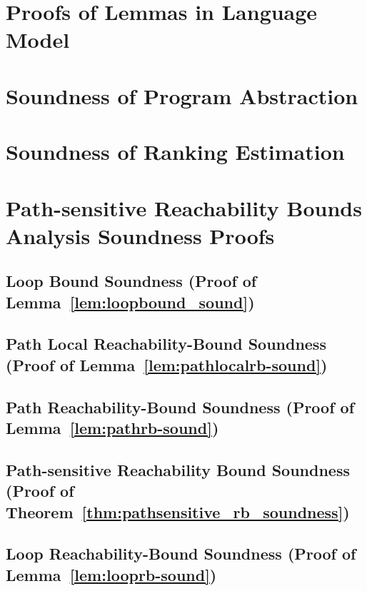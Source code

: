 % 


\section{Proofs of Lemmas in Language Model}
\label{apdx:lem_language}

\clearpage
\section{Soundness of Program Abstraction}
\label{apdx:abs_sound}

\clearpage
\section{Soundness of Ranking Estimation}
\label{apdx:pathinsensitive_rb_soundness}

\clearpage


\section{Path-sensitive Reachability Bounds Analysis Soundness Proofs}
\label{apdx:pathsensitive_rb_soundness}

\subsection{Loop Bound Soundness (Proof of Lemma~\ref{lem:loopbound_sound})}
\label{apdx:loopbound-sound}

\clearpage

\subsection{Path Local Reachability-Bound Soundness (Proof of Lemma~\ref{lem:pathlocalrb-sound})}
\label{apdx:pathlocalrb-sound}

\clearpage

\subsection{Path Reachability-Bound Soundness (Proof of Lemma~\ref{lem:pathrb-sound})}
\label{apdx:pathrb-sound}

\clearpage

\subsection{Path-sensitive Reachability Bound Soundness (Proof of Theorem~\ref{thm:pathsensitive_rb_soundness})}
\label{apdx:psrb-sound}

\clearpage

\subsection{Loop Reachability-Bound Soundness (Proof of Lemma~\ref{lem:looprb-sound})}
\label{apdx:looprb-sound}

\clearpage


